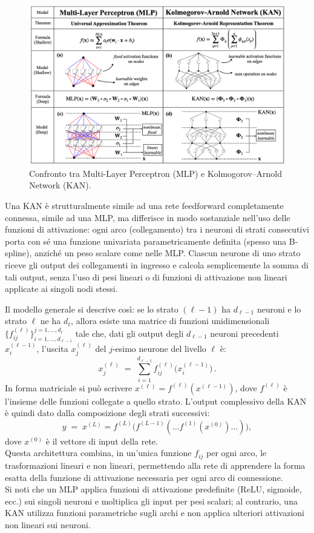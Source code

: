 \documentclass[a4paper,12pt]{report}
\begin{document}
	\begin{figure}[H]
		\centering
		\includegraphics[width=1.0\textwidth]{img/KANvsMLP.png}
		\caption{Confronto tra Multi-Layer Perceptron (MLP) e Kolmogorov–Arnold Network (KAN).}
	\end{figure}
	Una KAN è strutturalmente simile ad una rete feedforward completamente connessa, simile ad una MLP, ma differisce in modo sostanziale nell'uso delle funzioni di attivazione: ogni arco (collegamento) tra i neuroni di strati consecutivi porta con sé una funzione univariata parametricamente definita (spesso una B-spline), anziché un peso scalare come nelle MLP. Ciascun neurone di uno strato riceve gli output dei collegamenti in ingresso e calcola semplicemente la somma di tali output, senza l’uso di pesi lineari o di funzioni di attivazione non lineari applicate ai singoli nodi stessi.
	
	Il modello generale si descrive così: se lo strato $(\ell-1)$ ha $d_{\ell-1}$ neuroni e lo strato $\ell$ ne ha $d_\ell$, allora esiste una matrice di funzioni unidimensionali $\{f^{(\ell)}_{ij}\}_{i=1,\dots,d_{\ell-1}}^{j=1,\dots,d_\ell}$ tale che, dati gli output degli $d_{\ell-1}$ neuroni precedenti $x_i^{(\ell-1)}$, l’uscita $x_j^{(\ell)}$ del $j$-esimo neurone del livello $\ell$ è: 
	\[
	x_j^{(\ell)} \;=\; \sum_{i=1}^{d_{\ell-1}} f^{(\ell)}_{ij}\bigl(x_i^{(\ell-1)}\bigr)\,.
	\] 
	In forma matriciale si può scrivere $x^{(\ell)} = f^{(\ell)}(x^{(\ell-1)})$, dove $f^{(\ell)}$ è l’insieme delle funzioni collegate a quello strato. L’output complessivo della KAN è quindi dato dalla composizione degli strati successivi: 
	\[
	y \;=\; x^{(L)} 
	= f^{(L)}\bigl(f^{(L-1)}(\dots f^{(1)}(x^{(0)})\dots)\bigr)\!,
	\] 
	dove $x^{(0)}$ è il vettore di input della rete. \\
	Questa architettura combina, in un’unica funzione $f_{ij}$ per ogni arco, le trasformazioni lineari e non lineari, permettendo alla rete di apprendere la forma esatta della funzione di attivazione necessaria per ogni arco di connessione. \\
	Si noti che un MLP applica funzioni di attivazione predefinite (ReLU, sigmoide, ecc.) sui singoli neuroni e moltiplica gli input per pesi scalari; al contrario, una KAN utilizza funzioni parametriche sugli archi e non applica ulteriori attivazioni non lineari sui neuroni.
	
\end{document}
